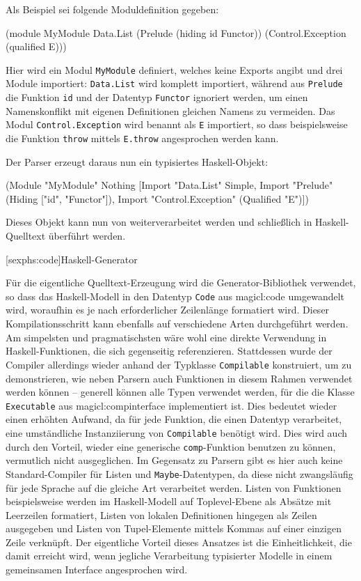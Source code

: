 \documentclass[12pt, a4paper, bibgerm]{scrbook}
\newenvironment{DIFnomarkup}{}{}
\newcommand\icode[1]{\lstinline?#1?}
\newcommand\lsection{}
\newcommand\sref{}
\begin{document}
Als Beispiel sei folgende Moduldefinition gegeben:
\begin{DIFnomarkup}\begin{code}
(module MyModule
  Data.List
  (Prelude (hiding id Functor))
  (Control.Exception (qualified E)))
\end{code}\end{DIFnomarkup}
Hier wird ein Modul \icode{MyModule} definiert, welches keine Exports
angibt und drei Module importiert: \icode{Data.List} wird komplett
importiert, während aus \icode{Prelude} die Funktion \icode{id} und der
Datentyp \icode{Functor} ignoriert werden, um einen Namenskonflikt mit
eigenen Definitionen gleichen Namens zu vermeiden. Das Modul
\icode{Control.Exception} wird benannt als \icode{E} importiert, so dass
beispielsweise die Funktion \icode{throw} mittels \icode{E.throw}
angesprochen werden kann.

Der Parser erzeugt daraus nun ein typisiertes Haskell-Objekt:
\begin{DIFnomarkup}\begin{code}
(Module "MyModule"
         Nothing
         [Import "Data.List" Simple,
          Import "Prelude" (Hiding ["id", "Functor"]),
          Import "Control.Exception" (Qualified "E")])
\end{code}\end{DIFnomarkup}
Dieses Objekt kann nun von weiterverarbeitet werden und schließlich in
Haskell-Quelltext überführt werden.

\lsection[sexphs:code]{Haskell-Generator}

Für die eigentliche Quelltext-Erzeugung wird die Generator-Bibliothek
verwendet, so dass das Haskell-Modell in den
Datentyp \icode{Code} aus \sref{magicl:code} umgewandelt wird, woraufhin
es je nach erforderlicher Zeilenlänge formatiert wird. Dieser
Kompilationsschritt kann ebenfalls auf verschiedene Arten durchgeführt
werden. Am simpelsten und pragmatischsten wäre wohl eine direkte
Verwendung in Haskell-Funktionen, die sich gegenseitig
referenzieren. Stattdessen wurde der Compiler allerdings wieder
anhand der Typklasse \icode{Compilable} konstruiert, um zu
demonstrieren, wie neben Parsern auch Funktionen in diesem Rahmen
verwendet werden können -- generell können alle Typen verwendet werden,
für die die Klasse \icode{Executable} aus \sref{magicl:compinterface}
implementiert ist. Dies bedeutet wieder einen erhöhten Aufwand, da für
jede Funktion, die einen Datentyp verarbeitet, eine umständliche
Instanziierung von \icode{Compilable} benötigt wird. Dies wird auch
durch den Vorteil, wieder eine generische \icode{comp}-Funktion
benutzen zu können, vermutlich nicht ausgeglichen. Im Gegensatz zu
Parsern gibt es hier auch keine Standard-Compiler für Listen und
\icode{Maybe}-Datentypen, da diese nicht zwangsläufig für jede Sprache
auf die gleiche Art verarbeitet werden. Listen von Funktionen
beispielsweise werden im Haskell-Modell auf Toplevel-Ebene als Absätze
mit Leerzeilen formatiert, Listen von lokalen Definitionen hingegen
als Zeilen ausgegeben und Listen von Tupel-Elemente mittels Kommas
auf einer einzigen Zeile verknüpft. Der eigentliche Vorteil dieses
Ansatzes ist die Einheitlichkeit, die damit erreicht wird, wenn
jegliche Verarbeitung typisierter Modelle in einem gemeinsamen
Interface angesprochen wird.
\end{document}
